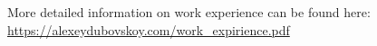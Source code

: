 
\begin{cvparagraph}

  More detailed information on work experience can be found here: \url{https://alexeydubovskoy.com/work_expirience.pdf}

\end{cvparagraph}
